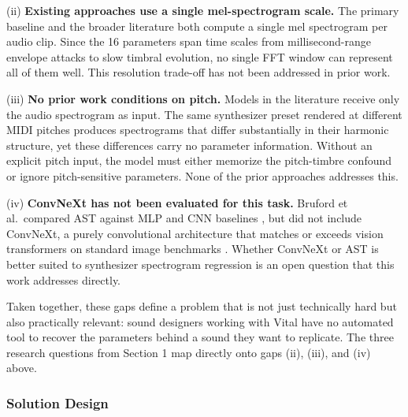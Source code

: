 \par \vspace{0.3cm}
\noindent (ii) \textbf{Existing approaches use a single mel-spectrogram scale.} The primary baseline \cite{bruford2024ast} and the broader literature both compute a single mel spectrogram per audio clip. Since the 16 parameters span time scales from millisecond-range envelope attacks to slow timbral evolution, no single FFT window can represent all of them well. This resolution trade-off has not been addressed in prior work.

\par \vspace{0.3cm}
\noindent (iii) \textbf{No prior work conditions on pitch.} Models in the literature receive only the audio spectrogram as input. The same synthesizer preset rendered at different MIDI pitches produces spectrograms that differ substantially in their harmonic structure, yet these differences carry no parameter information. Without an explicit pitch input, the model must either memorize the pitch-timbre confound or ignore pitch-sensitive parameters. None of the prior approaches addresses this.

\par \vspace{0.3cm}
\noindent (iv) \textbf{ConvNeXt has not been evaluated for this task.} Bruford et al.\ compared AST against MLP and CNN baselines \cite{bruford2024ast}, but did not include ConvNeXt, a purely convolutional architecture that matches or exceeds vision transformers on standard image benchmarks \cite{liu2022convnext}. Whether ConvNeXt or AST is better suited to synthesizer spectrogram regression is an open question that this work addresses directly.

\par \vspace{0.3cm}
\noindent Taken together, these gaps define a problem that is not just technically hard but also practically relevant: sound designers working with Vital have no automated tool to recover the parameters behind a sound they want to replicate. The three research questions from Section 1 map directly onto gaps (ii), (iii), and (iv) above.

\subsubsection{Solution Design}

